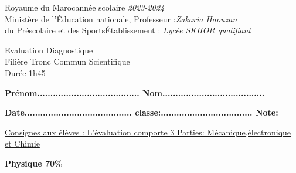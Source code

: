 \documentclass[12pt]{article}
\newcommand\headerMe[2]{\noindent{}#1\hfill#2}
\begin{document}
\headerMe{Royaume du Maroc}{année scolaire \emph{2023-2024}}\\
\headerMe{Ministère de l'Éducation nationale, }{  Professeur :\emph{Zakaria Haouzan}}\\
\headerMe{du Préscolaire et des Sports}{Établissement : \emph{Lycée SKHOR qualifiant}}\\
\begin{center}
	\vspace{-0.8cm}
Evaluation Diagnostique \\
Filière Tronc Commun Scientifique\\
Durée 1h45
\\
\end{center}
\begin{center}
	\vspace{-0.2cm}
	\textbf{ Prénom.......................................  Nom.......................................}
	
	\vspace{0.2cm}
	\textbf{ Date.........................................  classe:................................... Note: }
		
\end{center}
\begin{center}

	\vspace{-0.55cm}
\underline{Consignes aux élèves : L’évaluation comporte 3 Parties: Mécanique,électronique et Chimie}

	\hrulefill
\textbf{Physique 70\%}
\hrulefill
\end{center}
\end{document}
